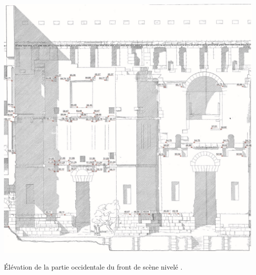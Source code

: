 \begin{figureth}
	\includegraphics[width=\linewidth]{images/frontdescene}
	\caption[Elévation du front de scène.]{Élévation de la partie occidentale du front de scène nivelé \footnotemark.}
	\label{frontdescene} 
\end{figureth}
\newpage

